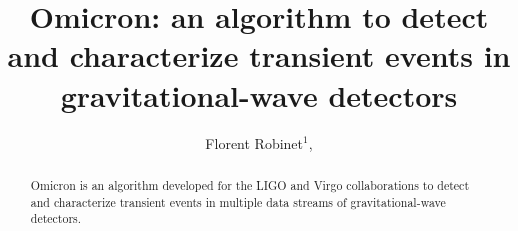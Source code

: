 \documentclass[aps]{revtex4-1}
\begin{document}

\title{Omicron: an algorithm to detect and characterize transient events in gravitational-wave detectors}

\begin{abstract}
  Omicron is an algorithm developed for the LIGO and Virgo collaborations to detect and characterize transient events in multiple data streams of gravitational-wave detectors.
\end{abstract}

\author{
  Florent Robinet$^1$,  
}
        
\address{$^1$LAL, Univ Paris-Sud, CNRS/IN2P3, Orsay, France}

\maketitle










\end{document}
